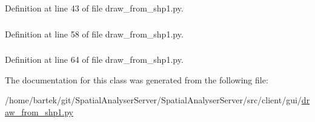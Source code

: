 Definition at line 43 of file draw\_\-from\_\-shp1.py.

\hypertarget{classsrc_1_1client_1_1gui_1_1draw__from__shp1_1_1Ui__DrawSHPImage_a642ecf9b1802fcbb782f009353669996}{
\subsubsection[{tab\_\-3}]{}}
\label{classsrc_1_1client_1_1gui_1_1draw__from__shp1_1_1Ui__DrawSHPImage_a642ecf9b1802fcbb782f009353669996}


Definition at line 58 of file draw\_\-from\_\-shp1.py.

\hypertarget{classsrc_1_1client_1_1gui_1_1draw__from__shp1_1_1Ui__DrawSHPImage_a325b848cb3a1398cd463a218ad0e0e2a}{
\subsubsection[{tab\_\-4}]{}}
\label{classsrc_1_1client_1_1gui_1_1draw__from__shp1_1_1Ui__DrawSHPImage_a325b848cb3a1398cd463a218ad0e0e2a}


Definition at line 64 of file draw\_\-from\_\-shp1.py.



The documentation for this class was generated from the following file:\begin{DoxyCompactItemize}
\item 
/home/bartek/git/SpatialAnalyserServer/SpatialAnalyserServer/src/client/gui/\hyperlink{draw__from__shp1_8py}{draw\_\-from\_\-shp1.py}\end{DoxyCompactItemize}
